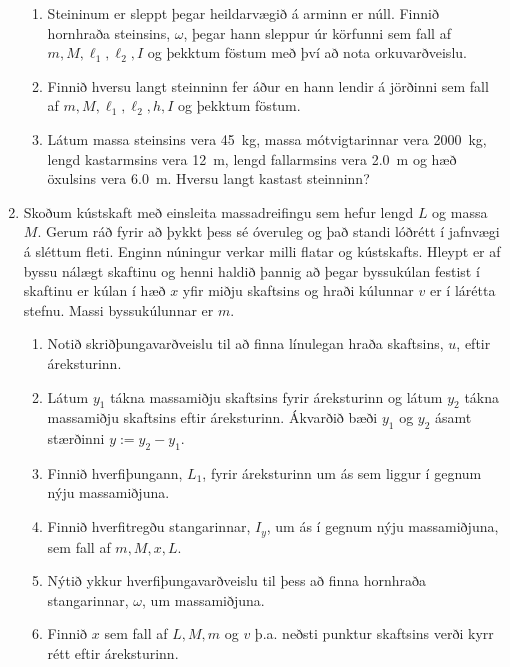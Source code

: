 \ifdefined \wholebook \else\documentclass[oneside]{book}\usepackage{EdlBook}\graphicspath{{figures/}}
\begin{document}
\begin{enumerate}[label = \textbf{Dæmi \thechapter.\arabic*.}]
\begin{enumerate}[label=\textbf{(\alph*)}]
    \item Steininum er sleppt þegar heildarvægið á arminn er núll. Finnið hornhraða steinsins, \(\omega\), þegar hann sleppur úr körfunni sem fall af $m, M, \ell_1, \ell_2, I$ og þekktum föstum með því að nota orkuvarðveislu.

    
    \item Finnið hversu langt steinninn fer áður en hann lendir á jörðinni sem fall af $m, M, \ell_1, \ell_2, h, I$ og þekktum föstum.
    
    \item Látum massa steinsins vera \SI{45}{kg}, massa mótvigtarinnar vera \SI{2000}{kg}, lengd kastarmsins vera \SI{12}{m}, lengd fallarmsins vera \SI{2.0}{m} og hæð öxulsins vera \SI{6.0}{m}. Hversu langt kastast steinninn?
\end{enumerate}

\item Skoðum kústskaft með einsleita massadreifingu sem hefur lengd $L$ og massa $M$. Gerum ráð fyrir að þykkt þess sé óveruleg og það standi lóðrétt í jafnvægi á sléttum fleti. Enginn núningur verkar milli flatar og kústskafts. Hleypt er af byssu nálægt skaftinu og henni haldið þannig að þegar byssukúlan festist í skaftinu er kúlan í hæð $x$ yfir miðju skaftsins og hraði kúlunnar $v$ er í lárétta stefnu. Massi byssukúlunnar er $m$. 

\begin{enumerate}[label = \textbf{(\alph*)}]
    \item Notið skriðþungavarðveislu til að finna línulegan hraða skaftsins, $u$, eftir áreksturinn.
    
    \item Látum $y_1$ tákna massamiðju skaftsins fyrir áreksturinn og látum $y_2$ tákna massamiðju skaftsins eftir áreksturinn. Ákvarðið bæði $y_1$ og $y_2$ ásamt stærðinni $y := y_2-y_1$.
    
    \item Finnið hverfiþungann, $L_{1}$, fyrir áreksturinn um ás sem liggur í gegnum nýju massamiðjuna.
    
    \item Finnið hverfitregðu stangarinnar, $I_y$, um ás í gegnum nýju massamiðjuna, sem fall af $m, M, x, L$.
    
    \item Nýtið ykkur hverfiþungavarðveislu til þess að finna hornhraða stangarinnar, $\omega$, um massamiðjuna.
    
    \item Finnið $x$ sem fall af $L, M, m$ og $v$ þ.a. neðsti punktur skaftsins verði kyrr rétt eftir áreksturinn.
\end{enumerate}

\end{enumerate}
\end{document}
